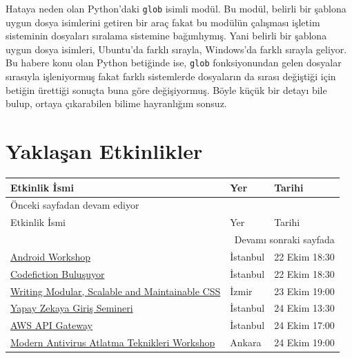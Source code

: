 \documentclass[11pt]{article}
\begin{document}
Hataya neden olan Python'daki \texttt{glob} isimli modül. Bu modül, belirli
bir şablona uygun dosya isimlerini getiren bir araç fakat bu modülün
çalışması işletim sisteminin dosyaları sıralama sistemine
bağımlıymış. Yani belirli bir şablona uygun dosya isimleri,
Ubuntu'da farklı sırayla, Windows'da farklı sırayla geliyor. Bu
habere konu olan Python betiğinde ise, \texttt{glob} fonksiyonundan gelen
dosyalar sırasıyla işleniyormuş fakat farklı sistemlerde dosyaların
da sırası değiştiği için betiğin ürettiği sonuçta buna göre
değişiyormuş. Böyle küçük bir detayı bile bulup, ortaya çıkarabilen
bilime hayranlığım sonsuz.
\section{Yaklaşan Etkinlikler}
\label{sec:org5fcb969}
\begin{longtable}{|p{8cm}|l|l|}
\hline
Etkinlik İsmi & Yer & Tarihi\\
\hline
\endfirsthead
\multicolumn{3}{l}{Önceki sayfadan devam ediyor} \\
\hline

Etkinlik İsmi & Yer & Tarihi \\

\hline
\endhead
\hline\multicolumn{3}{r}{Devamı sonraki sayfada} \\
\endfoot
\endlastfoot
\hline
\href{https://www.eventbrite.com/e/android-workshop-tickets-77583066039}{Android Workshop} & İstanbul & 22 Ekim 18:30\\
\href{https://kommunity.com/codefiction/events/codefiction-bulusuyor}{Codefiction Buluşuyor} & İstanbul & 22 Ekim 18:30\\
\href{https://kommunity.com/atolye15/events/writing-modular-scalable-and-maintainable-css}{Writing Modular, Scalable and Maintainable CSS} & İzmir & 23 Ekim 19:00\\
\href{https://www.eventbrite.com/e/yapay-zekaya-giris-semineri-tickets-75830441893}{Yapay Zekaya Giriş Semineri} & İstanbul & 24 Ekim 13:30\\
\href{https://kommunity.com/sovos-foriba-rd/events/aws-api-gateway}{AWS API Gateway} & İstanbul & 24 Ekim 17:00\\
\href{https://www.eventbrite.com/e/modern-antivirus-atlatma-teknikleri-workshop-hacknightsorg-tickets-77325327135}{Modern Antivirus Atlatma Teknikleri Workshop} & Ankara & 24 Ekim 19:00\\
\hline
\end{longtable}
\end{document}
